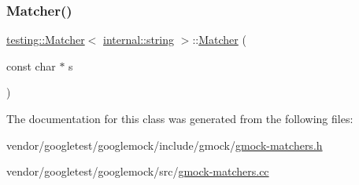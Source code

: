 \mbox{\label{classtesting_1_1_matcher_3_01internal_1_1string_01_4_a65f1d7616edb049ac059ad5d3fa2d625}} 
\subsubsection{\texorpdfstring{Matcher()}{Matcher()}\hspace{0.1cm}{\footnotesize\ttfamily [4/4]}}
{\footnotesize\ttfamily \hyperlink{classtesting_1_1_matcher}{testing\+::\+Matcher}$<$ \hyperlink{namespacetesting_1_1internal_a8e8ff5b11e64078831112677156cb111}{internal\+::string} $>$\+::\hyperlink{classtesting_1_1_matcher}{Matcher} (\begin{DoxyParamCaption}\item[{const char $\ast$}]{s }\end{DoxyParamCaption})}



The documentation for this class was generated from the following files\+:\begin{DoxyCompactItemize}
\item 
vendor/googletest/googlemock/include/gmock/\hyperlink{gmock-matchers_8h}{gmock-\/matchers.\+h}\item 
vendor/googletest/googlemock/src/\hyperlink{gmock-matchers_8cc}{gmock-\/matchers.\+cc}\end{DoxyCompactItemize}
